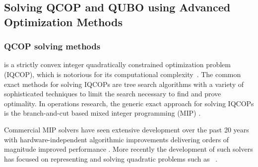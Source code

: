 \documentclass[preprint,12pt]{elsarticle}
\newcommand{\qcls}{{\sf {\small QC-LS\xspace}}}
\begin{document}
\subsection{Solving QCOP and QUBO using Advanced Optimization Methods}

\subsubsection{QCOP solving methods}
\label{quadratic}
\qcls{} is a strictly convex integer 
quadratically constrained optimization problem (IQCOP), which is notorious for its computational complexity~\cite{van1981another}.
The common exact methods for solving
IQCOPs are tree search \cite{land2010automatic} algorithms with a variety of sophisticated techniques to limit the search necessary to find and prove optimality.  In operations research, the generic exact approach for solving IQCOPs is the branch-and-cut based mixed integer programming (MIP) \cite{bonami2008algorithmic}.


Commercial MIP solvers have seen extensive development over the past 20 years with hardware-independent algorithmic improvements delivering orders of magnitude improved performance \cite{Bixby07a}. More recently the development of such solvers has focused on representing and solving quadratic problems such as \qcls{}~\cite{Furini19a}.

\end{document}
